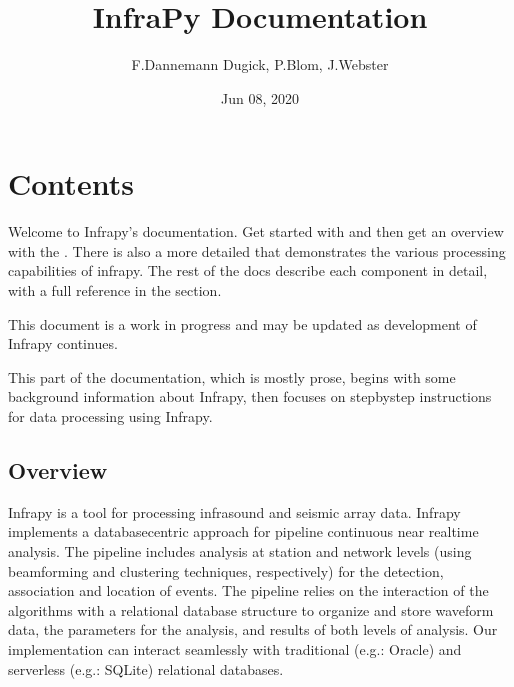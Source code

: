 \documentclass[letterpaper,10pt,english]{sphinxmanual}
\title{InfraPy Documentation}
\date{Jun 08, 2020}
\author{F.Dannemann Dugick, P.Blom, J.Webster }
\begin{document}
\pagestyle{empty}
\sphinxmaketitle
\pagestyle{plain}
\sphinxtableofcontents
\pagestyle{normal}
\label{\detokenize{index::doc}}



\chapter{Contents}
\label{\detokenize{index:module-infrapy}}\label{\detokenize{index:contents}}
Welcome to Infrapy’s documentation.  Get started with {\hyperref[\detokenize{installation:installation}]{}} and then get an overview with the {\hyperref[\detokenize{quickstart:quickstart}]{}}.  There is also a more detailed {\hyperref[\detokenize{tutorial:tutorial}]{}} that demonstrates the various processing capabilities of infrapy.  The rest of the docs describe each component in detail, with a full reference in the {\hyperref[\detokenize{infrapy:api}]{}} section.

This document is a work in progress and may be updated as development of Infrapy continues.

\noindent{}

This part of the documentation, which is mostly prose, begins with some background information about Infrapy, then focuses on step\sphinxhyphen{}by\sphinxhyphen{}step instructions for data processing using Infrapy.


\section{Overview}
\label{\detokenize{userguide:overview}}\label{\detokenize{userguide::doc}}
Infrapy is a tool for processing infrasound and seismic array data. Infrapy implements a database\sphinxhyphen{}centric
approach for pipeline continuous near real\sphinxhyphen{}time analysis. The pipeline includes analysis at station and network levels (using beam\sphinxhyphen{}forming and clustering techniques, respectively) for the
detection, association and location of events.  The pipeline relies on the interaction of the algorithms with a relational database structure to organize and store waveform data, the
parameters for the analysis, and results of both levels of analysis. Our implementation can interact seamlessly with traditional (e.g.: Oracle) and serverless (e.g.: SQLite) relational databases.
\end{document}
